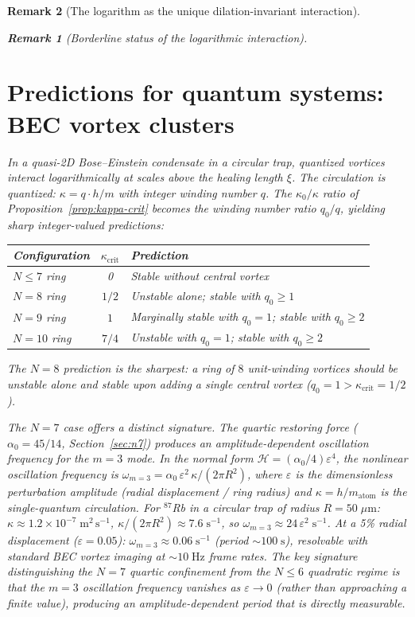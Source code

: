 \documentclass[12pt, a4paper]{article}
\newtheorem{remark}{Remark}[section]
\numberwithin{equation}{section}
\begin{document}
\begin{remark}[The logarithm as the unique dilation-invariant interaction]
\begin{remark}[Borderline status of the logarithmic interaction]
\section{Predictions for quantum systems: BEC vortex clusters}
\label{sec:quantum}
\label{sec:predictions}
\label{sec:bec}

In a quasi-2D Bose--Einstein condensate in a circular trap, quantized
vortices interact logarithmically at scales above the healing length
$\xi$.  The circulation is quantized:
$\kappa = q \cdot h/m$ with integer winding number $q$.
The $\kappa_0/\kappa$ ratio of Proposition~\ref{prop:kappa-crit}
becomes the winding number ratio $q_0/q$, yielding sharp integer-valued
predictions:

\begin{center}
\begin{tabular}{lcl}
\toprule
Configuration & $\kappa_{\mathrm{crit}}$ & Prediction \\
\midrule
$N \le 7$ ring & 0 & Stable without central vortex \\
$N = 8$ ring & $1/2$ & Unstable alone; stable with $q_0 \ge 1$ \\
$N = 9$ ring & $1$ & Marginally stable with $q_0 = 1$;
  stable with $q_0 \ge 2$ \\
$N = 10$ ring & $7/4$ & Unstable with $q_0 = 1$;
  stable with $q_0 \ge 2$ \\
\bottomrule
\end{tabular}
\end{center}

\noindent
The $N = 8$ prediction is the sharpest: a ring of $8$ unit-winding
vortices should be unstable alone and stable upon adding a single
central vortex ($q_0 = 1 > \kappa_{\mathrm{crit}} = 1/2$).

The $N = 7$ case offers a distinct signature.  The quartic restoring
force ($\alpha_0 = 45/14$, Section~\ref{sec:n7}) produces an
\emph{amplitude-dependent} oscillation frequency for the $m = 3$ mode.
In the normal form $\mathcal{H} = (\alpha_0/4)\varepsilon^4$, the
nonlinear oscillation frequency is
$\omega_{m=3} = \alpha_0\,\varepsilon^2\,\kappa/(2\pi R^2)$, where
$\varepsilon$ is the dimensionless perturbation amplitude (radial
displacement / ring radius) and $\kappa = h/m_{\mathrm{atom}}$ is the
single-quantum circulation.  For $^{87}$Rb in a circular trap of
radius $R = 50\;\mu\mathrm{m}$:
$\kappa \approx 1.2\times 10^{-7}\;\mathrm{m^2\,s^{-1}}$,
$\kappa/(2\pi R^2) \approx 7.6\;\mathrm{s^{-1}}$, so
$\omega_{m=3} \approx 24\,\varepsilon^2\;\mathrm{s^{-1}}$.  At a
5\% radial displacement ($\varepsilon = 0.05$):
$\omega_{m=3} \approx 0.06\;\mathrm{s^{-1}}$ (period $\sim\!100\;\mathrm{s}$),
resolvable with standard BEC vortex imaging at $\sim\!10\;\mathrm{Hz}$
frame rates.  The key signature distinguishing the $N = 7$
quartic confinement from the $N \le 6$ quadratic regime is that the
$m = 3$ oscillation frequency \emph{vanishes} as $\varepsilon \to 0$
(rather than approaching a finite value), producing an
amplitude-dependent period that is directly measurable.


\end{remark}
\end{remark}
\end{document}
